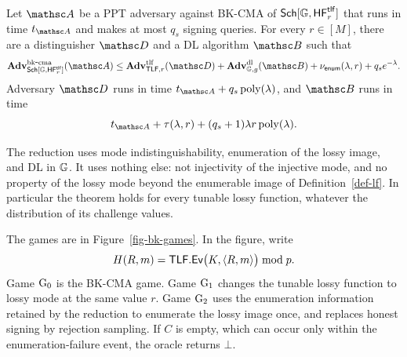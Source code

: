 \begin{theorem} \label{thm-bk}
Let $\advA$ be a PPT adversary against BK-CMA of
$\mathsf{Sch}[\mathbb{G},\mathsf{HF}^{\mathsf{tlf}}_r]$ that runs in time $t_{\advA}$ and makes
at most $q_s$ signing queries. For every $r\in[M]$, there are a distinguisher
$\advD$ and a DL algorithm $\advB$ such that
$$
\AdvBKCMA{\SchScheme[\GG,\HF^{\mathsf{tlf}}_r]}{\advA}
\le
\AdvTLF{\TLF,r}{\advD}
+\AdvDL{\GG,g}{\advB}
+\nu_{\mathsf{enum}}(\secp,r)
+q_s e^{-\secp}.
$$
Adversary $\advD$ runs in time $t_{\advA}+q_s\poly(\secp)$, and $\advB$ runs
in time
$$
t_{\advA}+\tau(\secp,r)+(q_s+1)\secp r\poly(\secp).
$$
\end{theorem}

The reduction uses mode indistinguishability, enumeration of the lossy image,
and DL in $\mathbb{G}$. It uses nothing else: not injectivity of the injective mode,
and no property of the lossy mode beyond the enumerable image of
Definition~\ref{def-lf}. In particular the theorem holds for every tunable lossy
function, whatever the distribution of its challenge values.

The games are in Figure~\ref{fig-bk-games}. In the figure, write
$$
H(R,m)=\mathsf{TLF}.\mathsf{Ev}\bigl(K,\langle R,m \rangle\bigr)\bmod p .
$$
Game $\textnormal{G}_0$ is the BK-CMA game. Game $\textnormal{G}_1$ changes the tunable lossy function
to lossy mode at the same value $r$. Game $\textnormal{G}_2$ uses the enumeration
information retained by the reduction to enumerate the lossy image once, and
replaces honest signing by rejection sampling. If $C$ is empty, which can occur
only within the enumeration-failure event, the oracle returns $\bot$.


